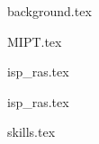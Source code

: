 \documentclass[11pt]{article}
\begin{document}

\noindent

{background.tex}


{MIPT.tex}


{isp_ras.tex}


{isp_ras.tex}






















{skills.tex}
\end{document}
